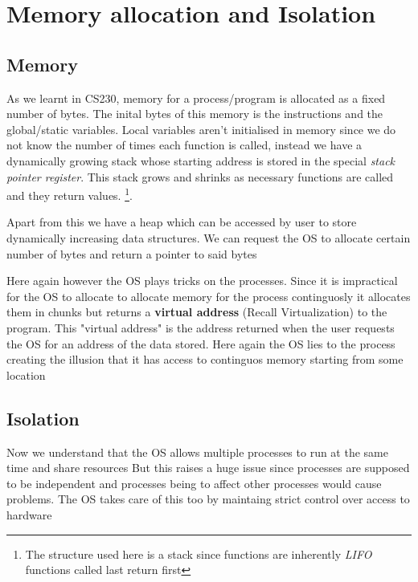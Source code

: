 \documentclass[12pt]{article}
\newcommand{\tbox}[1]{\noindent\fbox{\parbox{\textwidth}{#1}}}
\begin{document}
\section{Memory allocation and Isolation}
\label{section:mem_alloc}
\subsection{Memory}
As we learnt in CS230, memory for a process/program is allocated as a fixed number of bytes. The inital bytes
of this memory is the instructions and the global/static variables. Local variables aren't initialised in memory since
we do not know the number of times each function is called, instead we have a dynamically growing stack whose starting address is
stored in the special \textit{stack pointer register}. This stack grows and shrinks as necessary functions are called and they return values.
\footnote{The structure used here is a stack since functions are inherently \textit{LIFO} functions called last return first}.


Apart from this we have a heap which can be accessed by user to store dynamically increasing data structures. We can request the
OS to allocate certain number of bytes and return a pointer to said bytes


Here again however the OS plays tricks on the processes. Since it is impractical for the OS to allocate to 
allocate memory for the process continguosly it allocates them in chunks but returns a \textbf{virtual address} (Recall Virtualization) to the program. This "virtual address" is the
address returned when the user requests the OS for an address of the data stored. Here again the OS lies to the process creating the illusion that it has access to continguos memory starting
from some location

\noindent\tbox{
    \begin{center}
    \textbf{\Huge Lecture 2}
    \end{center}
}
\subsection{Isolation}
    \label{section:Isolation}
    Now we understand that the OS allows multiple processes to run at the same time and share resources
    But this raises a huge issue since processes are supposed to be independent and processes being to affect other 
    processes would cause problems. The OS takes care of this too by maintaing strict control over access to hardware
\end{document}
